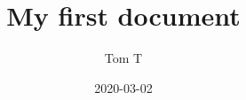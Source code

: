 %
%
%
%
%    
%
%
%    
%
%
%
%
%
%


\documentclass{article}
\title{My first document}
\date{2020-03-02}
\author{Tom T}


\usepackage{amsmath}


\maketitle
\newpage
{}


\begin{equation*}
    f(x) = x^2
\end{equation*}

\section{Section 1}
This is Section 1



